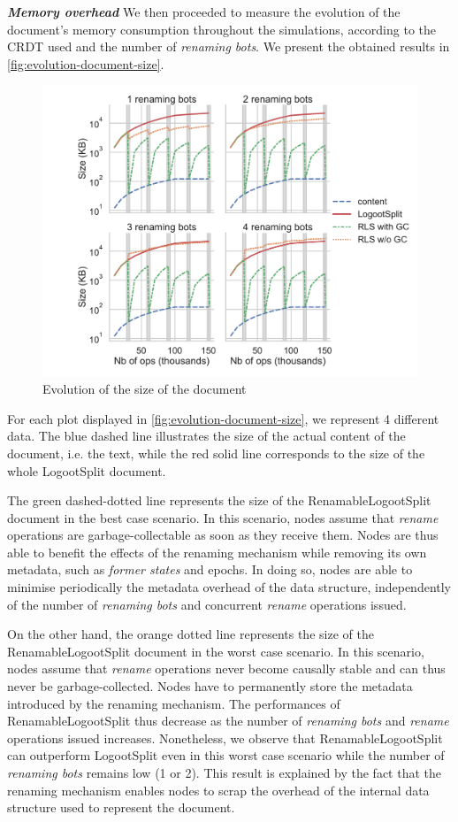 \documentclass[10pt,journal,compsoc]{IEEEtran}
\let\MYoriglatexcaption\caption
\renewcommand{\caption}[2][\relax]{\MYoriglatexcaption[#2]{#2}}
\newcommand{\ie}{i.e. }
\newcommand{\headerparagraph}[1]{\textbf{\emph{#1}}\quad}
\begin{document}
\headerparagraph{Memory overhead}
%
We then proceeded to measure the evolution of the document's memory consumption throughout the simulations, according to the CRDT used and the number of \emph{renaming bots}.
We present the obtained results in \autoref{fig:evolution-document-size}.

\begin{figure}[t!]
    \centering
    \includegraphics[width=\columnwidth]{img/snapshot-sizes.pdf}
    \caption{Evolution of the size of the document}
    \label{fig:evolution-document-size}
\end{figure}

For each plot displayed in \autoref{fig:evolution-document-size}, we represent 4 different data.
The blue dashed line illustrates the size of the actual content of the document, \ie the text, while the red solid line corresponds to the size of the whole LogootSplit document.

The green dashed-dotted line represents the size of the RenamableLogootSplit document in the best case scenario.
In this scenario, nodes assume that \emph{rename} operations are garbage-collectable as soon as they receive them.
Nodes are thus able to benefit the effects of the renaming mechanism while removing its own metadata, such as \emph{former states} and epochs.
In doing so, nodes are able to minimise periodically the metadata overhead of the data structure, independently of the number of \emph{renaming bots} and concurrent \emph{rename} operations issued.

On the other hand, the orange dotted line represents the size of the RenamableLogootSplit document in the worst case scenario.
In this scenario, nodes assume that \emph{rename} operations never become causally stable and can thus never be garbage-collected.
Nodes have to permanently store the metadata introduced by the renaming mechanism.
The performances of RenamableLogootSplit thus decrease as the number of \emph{renaming bots} and \emph{rename} operations issued increases.
Nonetheless, we observe that RenamableLogootSplit can outperform LogootSplit even in this worst case scenario while the number of \emph{renaming bots} remains low (1 or 2).
This result is explained by the fact that the renaming mechanism enables nodes to scrap the overhead of the internal data structure used to represent the document.
\end{document}
